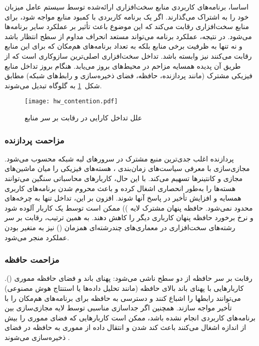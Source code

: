 اساسا، برنامه‌های کاربردی منابع سخت‌افزاری ارائه‌شده توسط سیستم‌ عامل میزبان خود را به اشتراک می‌گذارند. اگر یک برنامه کاربردی با کمبود منابع مواجه شود، برای منابع سخت‌افزاری رقابت می‌کند که این موضوع باعث تأثیر بر عملکرد سایر برنامه‌ها می‌شود. در نتیجه، عملکرد برنامه می‌تواند مستعد انحراف مداوم از سطح انتظار باشد و نه تنها به ظرفیت برخی منابع بلکه به تعداد برنامه‌های هم‌مکان که برای این منابع رقابت می‌کنند نیز وابسته باشد. تداخل سخت‌افزاری اصلی‌ترین سازوکاری است که از طریق آن پدیده همسایه مزاحم در محیط‌های  بروز می‌یابد. هنگام بروز تداخل منابع فیزیکی مشترک (مانند پردازنده‌، حافظه، فضای ذخیره‌سازی و رابط‌های شبکه) مطابق شکل~\ref{figure:hardware_contention} به گلوگاه تبدیل می‌شوند.

\vspace{0.5cm}
\begin{figure}[h]
\centering
\texttt{[image: hw\_contention.pdf]}
\caption{علل تداخل کارایی در رقابت بر سر منابع\cite{sa2019Survey}}
\label{figure:hardware_contention}
\end{figure}
\vspace{0.5cm}

\subsubsection{مزاحمت پردازنده}

پردازنده اغلب جدی‌ترین منبع مشترک در سرورهای لبه شبکه محسوب می‌شود. مجازی‌سازی با معرفی سیاست‌های زمان‌بندی ، هسته‌های فیزیکی را میان ماشین‌های مجازی و کانتینرها تسهیم‌ می‌کند. با این حال، کاربارهای محاسباتی سنگین می‌توانند هسته‌ها را به‌طور انحصاری اشغال کرده و باعث محروم شدن برنامه‌های کاربری همسایه و افزایش تأخیر در پاسخ آنها شوند. افزون بر این، تداخل تنها به چرخه‌های  محدود نمی‌شود. حافظه پنهان مشترک لایه )) ممکن است توسط یک کاربار آلوده شود و نرخ برخورد حافظه پنهان کارباری دیگر را کاهش دهند. به همین ترتیب، رقابت بر سر رشته‌های سخت‌افزاری در معماری‌های چندرشته‌ای همزمان ()  نیز به متغیر بودن عملکرد منجر می‌شود.

\subsubsection{مزاحمت حافظه}

رقابت بر سر حافظه از دو سطح ناشی می‌شود: پهنای باند و فضای حافظه مموری (). کاربارهایی با پهنای باند بالای حافظه (مانند تحلیل داده‌ها یا استنتاج هوش مصنوعی) می‌توانند رابطها را اشباع کنند و دسترسی به حافظه برای برنامه‌های هم‌مکان را با تأخیر مواجه سازند. همچنین اگر جداسازی مناسبی توسط لایه مجازی‌سازی بین برنامه‌های کاربردی انجام نشده باشد، ممکن است کاربارهایی که فضای مموری را بیش از اندازه اشغال می‌کنند باعث کند شدن و انتقال داده از مموری به حافظه  در فضای ذخیره‌سازی  می‌شوند \cite{pu2010iointerference}.

